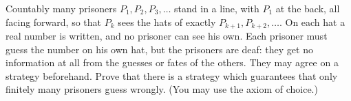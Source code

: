 Countably many prisoners $P_1,P_2,P_3,\ldots$ stand in a line, with $P_1$ at the back, all facing forward, so that $P_k$ sees the hats of exactly $P_{k+1},P_{k+2},\ldots$. On each hat a real number is written, and no prisoner can see his own. Each prisoner must guess the number on his own hat, but the prisoners are deaf: they get no information at all from the guesses or fates of the others. They may agree on a strategy beforehand. Prove that there is a strategy which guarantees that only finitely many prisoners guess wrongly. (You may use the axiom of choice.)
